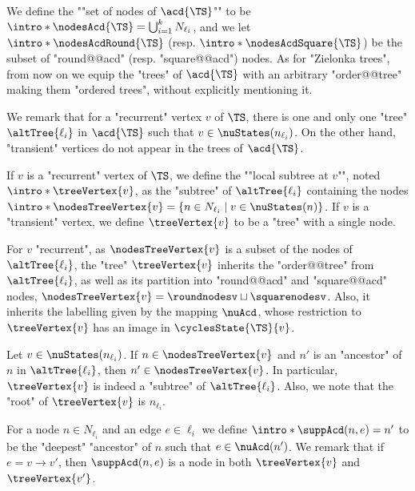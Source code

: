 \documentclass[10pt,a4paper]{amsart}
\newcommand{\re}[1]{\xrightarrow{#1}}
\begin{document}
\AP We define the ""set of nodes of $\acd{\TS}$"" to be $\intro*\nodesAcd{\TS} = \bigcup_{i = 1}^k N_{\ell_i}$, and we let $\intro*\nodesAcdRound{\TS}$ (resp. $\intro*\nodesAcdSquare{\TS}$) be the subset of "round@@acd" (resp. "square@@acd") nodes. 
As for "Zielonka trees", from now on we equip the "trees" of $\acd{\TS}$ with an arbitrary "order@@tree" making them "ordered trees", without explicitly mentioning it.


We remark that for a "recurrent" vertex $v$ of $\TS$, there is one and only one "tree" $\altTree{\ell_i}$ in $\acd{\TS}$ such that $v\in \nuStates(n_{\ell_i})$. On the other hand, "transient" vertices do not appear in the trees of $\acd{\TS}$.


\AP If $v$ is a "recurrent" vertex of $\TS$, we define the ""local subtree at $v$"", noted $\intro*\treeVertex{v}$, as the "subtree" of $\altTree{\ell_i}$ containing the nodes 
$ \intro*\nodesTreeVertex{v} = \{ n \in N_{\ell_i} \mid v\in \nuStates(n)\}$.
 If $v$ is a "transient" vertex, we define $\treeVertex{v}$ to be a "tree" with a single node.

For $v$ "recurrent", as $\nodesTreeVertex{v}$ is a subset of the nodes of $\altTree{\ell_i}$, the "tree" $\treeVertex{v}$ inherits the "order@@tree" from $\altTree{\ell_i}$, as well as its partition into "round@@acd" and "square@@acd" nodes, $\nodesTreeVertex{v} = \roundnodesv \sqcup \squarenodesv$. Also, it inherits the labelling given by the mapping $\nuAcd$, whose restriction to $\treeVertex{v}$ has an image in $\cyclesState{\TS}{v}$.

 

\begin{remark}\label{rmk-acd:treeVertex-closed-by-ancestor}
	Let $v\in \nuStates(n_{\ell_i})$. If $n\in \nodesTreeVertex{v}$ and $n'$ is an "ancestor" of $n$ in $\altTree{\ell_i}$, then $n'\in \nodesTreeVertex{v}$. In particular, $\treeVertex{v}$ is indeed a "subtree" of $\altTree{\ell_i}$. Also, we note that the "root" of $\treeVertex{v}$ is $n_{\ell_i}$.
\end{remark}


\AP For a node $n\in N_{\ell_i}$ and an edge $e\in \ell_i$ we define $\intro*\suppAcd(n,e) = n'$ to be the "deepest" "ancestor" of $n$ such that $e\in \nuAcd(n')$. We remark that if $e = v\re{} v'$, then $\suppAcd(n,e)$ is a node in both $\treeVertex{v}$ and $\treeVertex{v'}$. 
\end{document}
